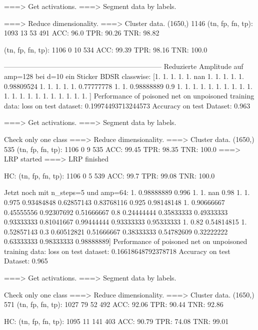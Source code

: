\documentclass[11pt,a4paper]{article}
\numberwithin{equation}{section}
\begin{document}
	===> Get activations.
	===> Segment data by labels.
	
	===> Reduce dimensionality.
	===> Cluster data.
	(1650,)
	1146
	(tn, fp, fn, tp):  1093 13 53 491
	ACC: 96.0
	TPR:  90.26
	TNR:  98.82
	
	
	(tn, fp, fn, tp):  1106 0 10 534
	ACC: 99.39
	TPR:  98.16
	TNR:  100.0
	
	--------------------------------------------------------------------
	Reduzierte Amplitude auf amp=128 bei d=10 ein Sticker
	BDSR classwise:
	[1.         1.         1.         1.         1.                nan
	1.         1.         1.         1.         1.         0.98809524
	1.         1.         1.         1.         1.         0.77777778
	1.         1.         0.98888889 0.9        1.         1.
	1.         1.         1.         1.         1.         1.
	1.         1.         1.         1.         1.         1.
	1.         1.         1.         1.         1.         1.
	1.        ]
	Performance of poisoned net on unpoisoned training data:
	loss on test dataset: 0.19974493713244573
	Accuracy on test Dataset: 0.963 
	
	===> Get activations.
	===> Segment data by labels.

	Check only one class
	===> Reduce dimensionality.
	===> Cluster data.
	(1650,)
	535
	(tn, fp, fn, tp):  1106 0 9 535
	ACC: 99.45
	TPR:  98.35
	TNR:  100.0
	===> LRP started
	===> LRP finished
	
	HC: (tn, fp, fn, tp):  1106 0 5 539
	ACC: 99.7
	TPR:  99.08
	TNR:  100.0
	
	Jetzt noch mit n_steps=5 und amp=64:
	1.         0.98888889 0.996      1.         1.                nan
	0.98       1.         1.         0.975      0.93484848 0.62857143
	0.83768116 0.925      0.98148148 1.         0.90666667 0.45555556
	0.92307692 0.51666667 0.8        0.24444444 0.35833333 0.49333333
	0.93333333 0.81041667 0.99444444 0.93333333 0.95333333 1.
	0.82       0.54814815 1.         0.52857143 0.3        0.60512821
	0.51666667 0.38333333 0.54782609 0.32222222 0.63333333 0.98333333
	0.98888889]
	Performance of poisoned net on unpoisoned training data:
	loss on test dataset: 0.16618648792378718
	Accuracy on test Dataset: 0.965 
	
	===> Get activations.
	===> Segment data by labels.
	
	Check only one class
	===> Reduce dimensionality.
	===> Cluster data.
	(1650,)
	571
	(tn, fp, fn, tp):  1027 79 52 492
	ACC: 92.06
	TPR:  90.44
	TNR:  92.86
	
	HC: (tn, fp, fn, tp):  1095 11 141 403
	ACC: 90.79
	TPR:  74.08
	TNR:  99.01
	
\end{document}
